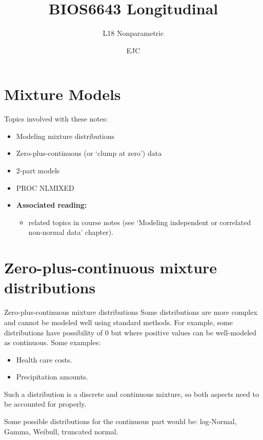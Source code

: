 \documentclass[
  9pt,
  ignorenonframetext,
]{beamer}
\title{BIOS6643 Longitudinal}
\subtitle{L18 Nonparametric}
\author{EJC}
\date{}
\institute{Department of Biostatistics \& Informatics}
\providecommand{\tightlist}{%
  \setlength{\itemsep}{0pt}\setlength{\parskip}{0pt}}
\begin{document}
\frame{\titlepage}

\begin{frame}[allowframebreaks]
  \tableofcontents[hideallsubsections]
\end{frame}
\hypertarget{mixture-models}{%
\section{Mixture Models}\label{mixture-models}}

\begin{frame}{Topics involved with these notes:}
\protect\hypertarget{topics-involved-with-these-notes}{}
\begin{itemize}
\item
  Modeling mixture distributions
\item
  Zero-plus-continuous (or `clump at zero') data
\item
  2-part models
\item
  PROC NLMIXED
\end{itemize}

\vspace{\baselineskip}

\begin{itemize}
\item
  \textbf{Associated reading:}

  \begin{itemize}
  \tightlist
  \item
    related topics in course notes (see `Modeling independent or
    correlated non-normal data' chapter).
  \end{itemize}
\end{itemize}
\end{frame}

\hypertarget{zero-plus-continuous-mixture-distributions}{%
\section{Zero-plus-continuous mixture
distributions}\label{zero-plus-continuous-mixture-distributions}}

\begin{frame}{Zero-plus-continuous mixture distributions}
\protect\hypertarget{zero-plus-continuous-mixture-distributions-1}{}
Some distributions are more complex and cannot be modeled well using
standard methods. For example, some distributions have possibility of 0
but where positive values can be well-modeled as continuous. Some
examples:

\begin{itemize}
\item
  Health care costs.
\item
  Precipitation amounts.
\end{itemize}

Such a distribution is a discrete and continuous mixture, so both
aspects need to be accounted for properly.

Some possible distributions for the continuous part would be:
log-Normal, Gamma, Weibull, truncated normal.
\end{frame}
\end{document}
